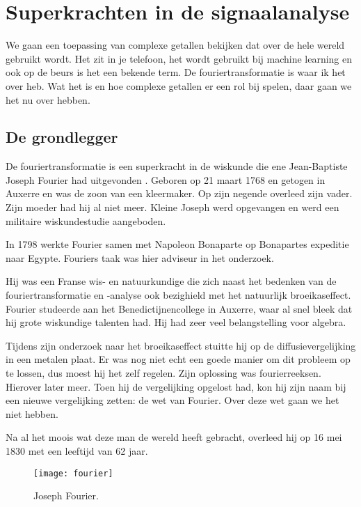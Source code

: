 \documentclass[11pt,fleqn]{book} %
\begin{document}

\chapter{Superkrachten in de signaalanalyse}\label{ch:four}

We gaan een toepassing van complexe getallen bekijken dat over de hele wereld gebruikt wordt. Het zit in je telefoon, het wordt gebruikt bij machine learning en ook op de beurs is het een bekende term. De fouriertransformatie is waar ik het over heb. Wat het is en hoe complexe getallen er een rol bij spelen, daar gaan we het nu over hebben.

\section{De grondlegger}

De fouriertransformatie is een superkracht in de wiskunde die ene Jean-Baptiste Joseph Fourier had uitgevonden \cite{jf}. Geboren op 21 maart 1768 en getogen in Auxerre en was de zoon van een kleermaker. Op zijn negende overleed zijn vader. Zijn moeder had hij al niet meer. Kleine Joseph werd opgevangen en werd een militaire wiskundestudie aangeboden.

In 1798 werkte Fourier samen met Napoleon Bonaparte op Bonapartes expeditie naar Egypte. Fouriers taak was hier adviseur in het onderzoek.

Hij was een Franse wis- en natuurkundige die zich naast het bedenken van de fouriertransformatie en -analyse ook bezighield met het natuurlijk broeikaseffect. Fourier studeerde aan het Benedictijnencollege in Auxerre, waar al snel bleek dat hij grote wiskundige talenten had. Hij had zeer veel belangstelling voor algebra.

Tijdens zijn onderzoek naar het broeikaseffect stuitte hij op de diffusievergelijking in een metalen plaat. Er was nog niet echt een goede manier om dit probleem op te lossen, dus moest hij het zelf regelen. Zijn oplossing was fourierreeksen. Hierover later meer. Toen hij de vergelijking opgelost had, kon hij zijn naam bij een nieuwe vergelijking zetten: de wet van Fourier. Over deze wet gaan we het niet hebben.

Na al het moois wat deze man de wereld heeft gebracht, overleed hij op 16 mei 1830 met een leeftijd van 62 jaar.
\begin{figure}[h]
	\centering\texttt{[image: fourier]}
	\caption{Joseph Fourier.}
	\label{fig:fourier}
\end{figure}
\end{document}

